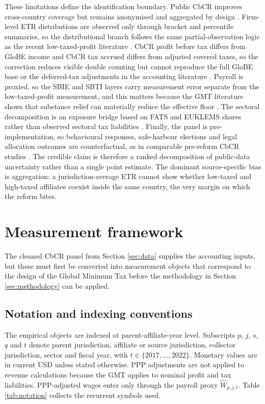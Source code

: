 \documentclass[11pt,a4paper]{article}
\begin{document}
These limitations define the identification boundary. Public CbCR improves cross-country coverage but remains anonymised and aggregated by design \citep{oecd2025a}. Firm-level ETR distributions are observed only through bracket and percentile summaries, so the distributional branch follows the same partial-observation logic as the recent low-taxed-profit literature \citep{hugger2026}. CbCR profit before tax differs from GloBE income and CbCR tax accrued differs from adjusted covered taxes, so the correction reduces visible double counting but cannot reproduce the full GloBE base or the deferred-tax adjustments in the accounting literature \citep{blouin2023,hanlon2023}. Payroll is proxied, so the SBIE and SBTI layers carry measurement error separate from the low-taxed-profit measurement, and this matters because the GMT literature shows that substance relief can materially reduce the effective floor \citep{devereux2023,schjelderup2024}. The sectoral decomposition is an exposure bridge based on FATS and EUKLEMS shares rather than observed sectoral tax liabilities \citep{devereux2023,schjelderup2024}. Finally, the panel is pre-implementation, so behavioural responses, safe-harbour elections and legal allocation outcomes are counterfactual, as in comparable pre-reform CbCR studies \citep{barake2022,boukal2026}. The credible claim is therefore a ranked decomposition of public-data uncertainty rather than a single point estimate. The dominant source-specific bias is aggregation: a jurisdiction-average ETR cannot show whether low-taxed and high-taxed affiliates coexist inside the same country, the very margin on which the reform bites.

\section{Measurement framework}\label{sec:measurement_framework}

The cleaned CbCR panel from Section \ref{sec:data} supplies the accounting inputs, but these must first be converted into measurement objects that correspond to the design of the Global Minimum Tax before the methodology in Section \ref{sec:methodology} can be applied. 

\subsection{Notation and indexing conventions}\label{sec:notation}

The empirical objects are indexed at parent-affiliate-year level. Subscripts $p$, $j$, $s$, $q$ and $t$ denote parent jurisdiction, affiliate or source jurisdiction, collector jurisdiction, sector and fiscal year, with $t \in \{2017,\ldots,2022\}$. Monetary values are in current USD unless stated otherwise. PPP adjustments are not applied to revenue calculations because the GMT applies to nominal profit and tax liabilities. PPP-adjusted wages enter only through the payroll proxy $\hat{W}_{p,j,t}$. Table \ref{tab:notation} collects the recurrent symbols used.
\end{document}
